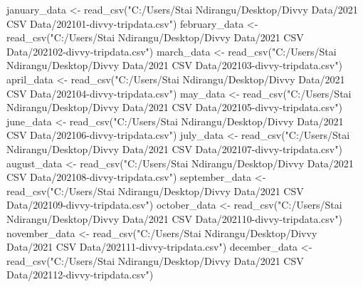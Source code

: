 \documentclass[
]{article}
\newenvironment{Shaded}{\begin{snugshade}}{\end{snugshade}}
\newcommand{\FunctionTok}[1]{\textcolor[rgb]{0.00,0.00,0.00}{#1}}
\newcommand{\NormalTok}[1]{#1}
\newcommand{\OtherTok}[1]{\textcolor[rgb]{0.56,0.35,0.01}{#1}}
\newcommand{\StringTok}[1]{\textcolor[rgb]{0.31,0.60,0.02}{#1}}
\begin{document}
\begin{Shaded}
\begin{Highlighting}[]
\NormalTok{january\_data }\OtherTok{\textless{}{-}} \FunctionTok{read\_csv}\NormalTok{(}\StringTok{"C:/Users/Stai Ndirangu/Desktop/Divvy Data/2021 CSV Data/202101{-}divvy{-}tripdata.csv"}\NormalTok{)}
\NormalTok{february\_data }\OtherTok{\textless{}{-}} \FunctionTok{read\_csv}\NormalTok{(}\StringTok{"C:/Users/Stai Ndirangu/Desktop/Divvy Data/2021 CSV Data/202102{-}divvy{-}tripdata.csv"}\NormalTok{)}
\NormalTok{march\_data }\OtherTok{\textless{}{-}} \FunctionTok{read\_csv}\NormalTok{(}\StringTok{"C:/Users/Stai Ndirangu/Desktop/Divvy Data/2021 CSV Data/202103{-}divvy{-}tripdata.csv"}\NormalTok{)}
\NormalTok{april\_data }\OtherTok{\textless{}{-}} \FunctionTok{read\_csv}\NormalTok{(}\StringTok{"C:/Users/Stai Ndirangu/Desktop/Divvy Data/2021 CSV Data/202104{-}divvy{-}tripdata.csv"}\NormalTok{)}
\NormalTok{may\_data }\OtherTok{\textless{}{-}} \FunctionTok{read\_csv}\NormalTok{(}\StringTok{"C:/Users/Stai Ndirangu/Desktop/Divvy Data/2021 CSV Data/202105{-}divvy{-}tripdata.csv"}\NormalTok{)}
\NormalTok{june\_data }\OtherTok{\textless{}{-}} \FunctionTok{read\_csv}\NormalTok{(}\StringTok{"C:/Users/Stai Ndirangu/Desktop/Divvy Data/2021 CSV Data/202106{-}divvy{-}tripdata.csv"}\NormalTok{)}
\NormalTok{july\_data }\OtherTok{\textless{}{-}} \FunctionTok{read\_csv}\NormalTok{(}\StringTok{"C:/Users/Stai Ndirangu/Desktop/Divvy Data/2021 CSV Data/202107{-}divvy{-}tripdata.csv"}\NormalTok{)}
\NormalTok{august\_data }\OtherTok{\textless{}{-}} \FunctionTok{read\_csv}\NormalTok{(}\StringTok{"C:/Users/Stai Ndirangu/Desktop/Divvy Data/2021 CSV Data/202108{-}divvy{-}tripdata.csv"}\NormalTok{)}
\NormalTok{september\_data }\OtherTok{\textless{}{-}} \FunctionTok{read\_csv}\NormalTok{(}\StringTok{"C:/Users/Stai Ndirangu/Desktop/Divvy Data/2021 CSV Data/202109{-}divvy{-}tripdata.csv"}\NormalTok{)}
\NormalTok{october\_data }\OtherTok{\textless{}{-}} \FunctionTok{read\_csv}\NormalTok{(}\StringTok{"C:/Users/Stai Ndirangu/Desktop/Divvy Data/2021 CSV Data/202110{-}divvy{-}tripdata.csv"}\NormalTok{)}
\NormalTok{november\_data }\OtherTok{\textless{}{-}} \FunctionTok{read\_csv}\NormalTok{(}\StringTok{"C:/Users/Stai Ndirangu/Desktop/Divvy Data/2021 CSV Data/202111{-}divvy{-}tripdata.csv"}\NormalTok{)}
\NormalTok{december\_data }\OtherTok{\textless{}{-}} \FunctionTok{read\_csv}\NormalTok{(}\StringTok{"C:/Users/Stai Ndirangu/Desktop/Divvy Data/2021 CSV Data/202112{-}divvy{-}tripdata.csv"}\NormalTok{)}
\end{Highlighting}
\end{Shaded}
\end{document}
